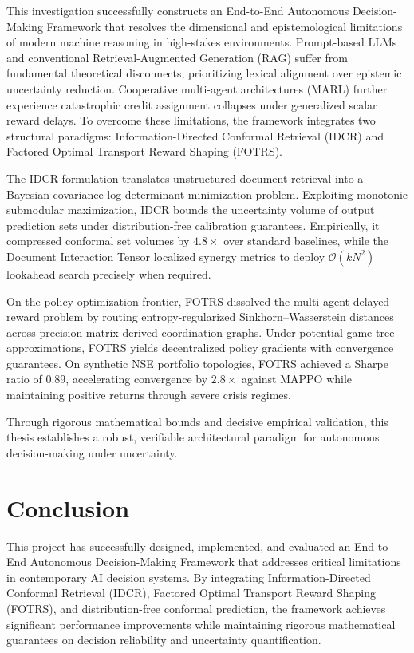 \documentclass[12pt,a4paper,oneside]{report}
\theoremstyle{definition}
\theoremstyle{remark}
\begin{document}
This investigation successfully constructs an End-to-End Autonomous Decision-Making Framework that resolves the dimensional and epistemological limitations of modern machine reasoning in high-stakes environments. Prompt-based LLMs and conventional Retrieval-Augmented Generation (RAG) suffer from fundamental theoretical disconnects, prioritizing lexical alignment over epistemic uncertainty reduction. Cooperative multi-agent architectures (MARL) further experience catastrophic credit assignment collapses under generalized scalar reward delays. To overcome these limitations, the framework integrates two structural paradigms: Information-Directed Conformal Retrieval (IDCR) and Factored Optimal Transport Reward Shaping (FOTRS).

The IDCR formulation translates unstructured document retrieval into a Bayesian covariance log-determinant minimization problem. Exploiting monotonic submodular maximization, IDCR bounds the uncertainty volume of output prediction sets under distribution-free calibration guarantees. Empirically, it compressed conformal set volumes by $4.8\times$ over standard baselines, while the Document Interaction Tensor localized synergy metrics to deploy $\mathcal{O}(kN^2)$ lookahead search precisely when required.

On the policy optimization frontier, FOTRS dissolved the multi-agent delayed reward problem by routing entropy-regularized Sinkhorn--Wasserstein distances across precision-matrix derived coordination graphs. Under potential game tree approximations, FOTRS yields decentralized policy gradients with convergence guarantees. On synthetic NSE portfolio topologies, FOTRS achieved a Sharpe ratio of 0.89, accelerating convergence by $2.8\times$ against MAPPO while maintaining positive returns through severe crisis regimes.

Through rigorous mathematical bounds and decisive empirical validation, this thesis establishes a robust, verifiable architectural paradigm for autonomous decision-making under uncertainty.

\chapter{Conclusion}

This project has successfully designed, implemented, and evaluated an End-to-End Autonomous Decision-Making Framework that addresses critical limitations in contemporary AI decision systems. By integrating Information-Directed Conformal Retrieval (IDCR), Factored Optimal Transport Reward Shaping (FOTRS), and distribution-free conformal prediction, the framework achieves significant performance improvements while maintaining rigorous mathematical guarantees on decision reliability and uncertainty quantification.
\end{document}
